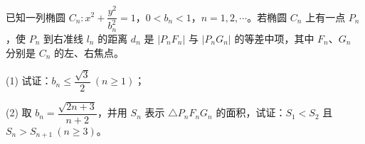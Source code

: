 \begin{question}
已知一列椭圆 \(C_n:x^2+\dfrac{y^2}{b_n^2}=1\)，\(0<b_n<1\)，\(n=1,2,\cdots\)。若椭圆 \(C_n\) 上有一点 \(P_n\)，使 \(P_n\) 到右准线 \(l_n\) 的距离 \(d_n\) 是 \(|P_nF_n|\) 与 \(|P_nG_n|\) 的等差中项，其中 $F_n\text{、}G_n$ 分别是 \(C_n\) 的左、右焦点。
\nopagebreak[4]
\begin{center}\end{center}
\nopagebreak[4]
(1) 试证：\(b_n\leq\dfrac{\sqrt3}{2}\ (n\geq1)\)；

(2) 取 \(b_n=\dfrac{\sqrt{2n+3}}{n+2}\)，并用 \(S_n\) 表示 \(\triangle P_nF_nG_n\) 的面积，试证：\(S_1<S_2\) 且 \(S_n>S_{n+1}\ (n\geq3)\)。

\end{question}